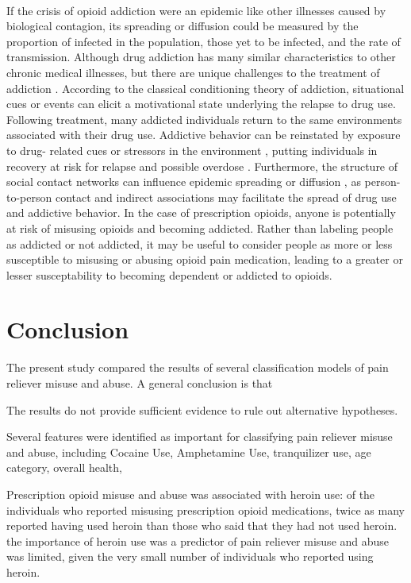 \\\documentclass[sigconf]{acmart}
\begin{document}
If the crisis of opioid addiction were an epidemic like other illnesses caused 
by biological contagion, its spreading or diffusion could be measured by the 
proportion of infected in the population, those yet to be infected, and the 
rate of transmission. Although drug addiction has many similar characteristics 
to other chronic medical illnesses, but there are unique challenges to the 
treatment of addiction \cite{marsch12, swendson16}. According to the classical 
conditioning theory of addiction, situational cues or events can elicit a 
motivational state underlying the relapse to drug use. Following treatment, 
many addicted individuals return to the same environments associated with 
their drug use. Addictive behavior can be reinstated by exposure to drug-
related cues or stressors in the environment \cite{shaham03}, putting
individuals in recovery at risk for relapse and possible overdose \cite{johnson11}. 
Furthermore, the structure of social contact networks can influence epidemic 
spreading or diffusion \cite{pastor01, watts98}, as person-to-person contact 
and indirect associations may facilitate the spread of drug use and addictive 
behavior. In the case of prescription opioids, anyone is potentially at 
risk of misusing opioids and becoming addicted. Rather than labeling people 
as addicted or not addicted, it may be useful to consider people as more or 
less susceptible to misusing or abusing opioid pain medication, leading to
a greater or lesser susceptability to becoming dependent or addicted to 
opioids. 

\section{Conclusion}

The present study compared the results of several classification models of 
pain reliever misuse and abuse. A general conclusion is that 

The results do not provide sufficient evidence to rule out alternative hypotheses. 

Several features were identified as important for classifying pain reliever
misuse and abuse, including Cocaine Use, Amphetamine Use, tranquilizer use,
age category, overall health,

Prescription opioid misuse and abuse was associated with heroin use: of 
the individuals who reported misusing prescription opioid medications, twice 
as many reported having used heroin than those who said that they had not used 
heroin. the importance of heroin use was a predictor of pain reliever misuse and
abuse was limited, given the very small number of individuals who reported 
using heroin.
\end{document}
